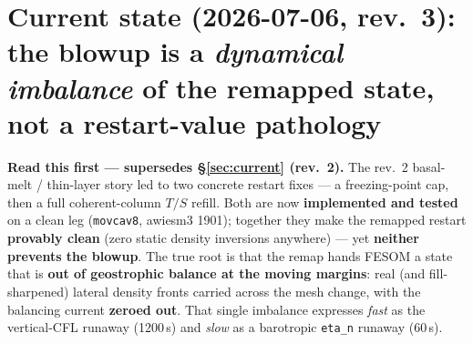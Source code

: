 \documentclass[11pt,a4paper]{article}
\newcommand{\code}[1]{\texttt{\small #1}}
\begin{document}
\section{Current state (2026-07-06, rev.~3): the blowup is a \emph{dynamical imbalance} of the remapped state, not a restart-value pathology}\label{sec:rev3}

\textbf{Read this first --- supersedes \S\ref{sec:current} (rev.~2).} The rev.~2 basal-melt /
thin-layer story led to two concrete restart fixes --- a freezing-point cap, then a full
coherent-column $T/S$ refill. Both are now \textbf{implemented and tested} on a clean leg
(\code{movcav8}, awiesm3 1901); together they make the remapped restart \textbf{provably clean}
(zero static density inversions anywhere) --- yet \textbf{neither prevents the blowup}. The true
root is that the remap hands FESOM a state that is \textbf{out of geostrophic balance at the
moving margins}: real (and fill-sharpened) lateral density fronts carried across the mesh change,
with the balancing current \textbf{zeroed out}. That single imbalance expresses \emph{fast} as
the vertical-CFL runaway (1200\,s) and \emph{slow} as a barotropic \code{eta\_n} runaway (60\,s).
\end{document}
